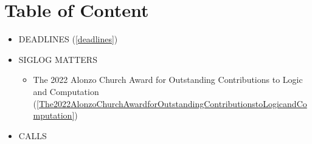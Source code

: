 \documentclass[prodmode,acmtecs]{acmsmall} %
\begin{document}
\section{Table of Content}\begin{itemize}\item DEADLINES (\cref{deadlines}) 
 
\item SIGLOG MATTERS 
 
\begin{itemize}\item The 2022 Alonzo Church Award for Outstanding Contributions to Logic and Computation (\cref{The2022AlonzoChurchAwardforOutstandingContributionstoLogicandComputation})
\end{itemize} 
\item CALLS 
 

\end{itemize}
\end{document}
